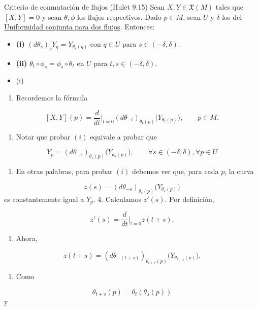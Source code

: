 \label{blk:39cc9a}
\begin{bookproposition}{Criterio de conmutación de flujos (Hulet 9.15)}
Sean $X,Y\in\mathfrak X(M)$ tales que $[X,Y]=0$ y sean $\theta,\phi$ los flujos respectivos. Dado $p\in M$, sean $U$ y $\delta$ los del \hyperref[blk:39cc9a]{Uniformidad conjunta para dos flujos}. Entonces:

\begin{itemize}
\item \textbf{(i)} $(d\theta_s)_qY_q=Y_{\theta_s(q)}$ con $q\in U$ para $s\in(-\delta,\delta)$.
\item \textbf{(ii)} $\theta_t\circ\phi_s=\phi_s\circ\theta_t$ en $U$ para $t,s\in(-\delta,\delta)$.
\end{itemize}
\end{bookproposition}
\begin{bookproof}{}
\begin{itemize}
\item (i)
\end{itemize}
\begin{enumerate}
\item Recordemos la fórmula
\end{enumerate}
\[
[X,Y](p)=\frac{d}{dt}\Big|_{t=0}(d\theta_{-t})_{\theta_t(p)}\big(Y_{\theta_t(p)}\big),\qquad p\in M.
\]
\begin{enumerate}[start=2]
\item Notar que probar $(i)$ equivale a probar que
\end{enumerate}
\[
Y_p=(d\theta_{-s})_{\theta_s(p)}\big(Y_{\theta_s(p)}\big),\qquad \forall s\in (-\delta ,\delta),\forall p\in U
\]
\begin{enumerate}[start=3]
\item En otras palabras, para probar $(i)$ debemos ver que, para cada $p$, la curva
\end{enumerate}
\[
z(s)=(d\theta_{-s})_{\theta_s(p)}\big(Y_{\theta_s(p)}\big)
\]
es constantemente igual a $Y_p$. 4. Calculamos $z'(s)$. Por definición,

\[
z'(s)=\frac{d}{dt}\Big|_{t=0}z(t+s).
\]
\begin{enumerate}[start=5]
\item Ahora,
\end{enumerate}
\[
z(t+s)=(d\theta_{-(t+s)})_{\theta_{t+s}(p)}\big(Y_{\theta_{t+s}(p)}\big).
\]
\begin{enumerate}[start=6]
\item Como
\end{enumerate}
\[
\theta_{t+s}(p)=\theta_t(\theta_s(p))
\]
y


\end{bookproof}
